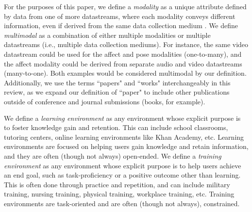 \documentclass[manuscript,screen,review]{acmart}
\begin{document}

For the purposes of this paper, we define a \textit{modality} as a unique attribute defined by data from one of more datastreams, where each modality conveys different information, even if derived from the same data collection medium \cite{Ochoa?}. We define \textit{multimodal} as a combination of either multiple modalities or multiple datastreams (i.e., multiple data collection mediums). For instance, the same video datastream could be used for the affect and pose modalities (one-to-many), and the affect modality could be derived from separate audio and video datastreams (many-to-one). Both examples would be considered multimodal by our definition. Additionally, we use the terms ``papers" and ``works" interchangeably in this review, as we expand our definition of ``paper" to include other publications outside of conference and journal submissions (books, for example).
 
We define a \textit{learning environment} as any environment whose explicit purpose is to foster knowledge gain and retention. This can include school classrooms, tutoring centers, online learning environments like Khan Academy, etc. Learning environments are focused on helping users gain knowledge and retain information, and they are often (though not always) open-ended. We define a \textit{training environment} as any environment whose explicit purpose is to help users achieve an end goal, such as task-proficiency or a positive outcome other than learning. This is often done through practice and repetition, and can include military training, nursing training, physical training, workplace training, etc. Training environments are task-oriented and are often (though not always), constrained. 
\end{document}

